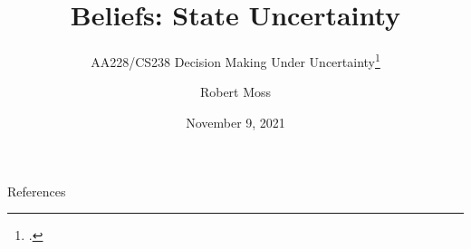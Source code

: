 \documentclass[aspectratio=169]{beamer}
\title{Beliefs: State Uncertainty}
\subtitle{AA228/CS238 Decision Making Under Uncertainty\footcite{Kochenderfer2020}}
\author{Robert Moss}
\institute{Stanford University}
\date{November 9, 2021}
\begin{document}
\begin{frame}
    \maketitle
\end{frame}














% 
% 



% 

% 
% 
% 
% 
% 
% 
% 




\begin{frame}{References}
    \renewcommand*{\bibfont}{\scriptsize}
    \printbibliography
\end{frame}
\end{document}
